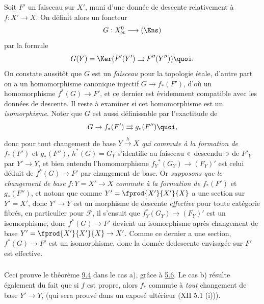 \documentclass[10pt]{../fichiers-configuration-latex/smfart}
\begin{document}
Soit $F'$ un faisceau sur $X'$, muni d'une donnée de descente
relativement à $f:X'\rightarrow X$. On définit alors un foncteur
$$
G:X^{0}_{\text{\rm ét}}\longrightarrow (\Ens)
$$
par la formule
$$
G(Y)=\Ker (F'(Y')\rightrightarrows F''(Y'')){\quoi}.
$$
On constate aussitôt que $G$ est un \emph{faisceau} pour la topologie
étale, d'autre part on a un homomorphisme canonique injectif
$G\rightarrow f_{\ast}(F')$, d'où un homomorphisme
$f^{\ast}(G)\rightarrow F'$, et ce dernier est évidemment compatible
avec les données de descente. Il reste à examiner si cet homomorphisme
est un \emph{isomorphisme}. Noter que $G$ est aussi définissable par
l'exactitude de
$$
G\rightarrow f_{\ast}(F')\rightrightarrows g_{\ast}(F''){\quoi},
$$
donc pour tout changement de base $Y\xrightarrow{h}X$ \emph{qui
  commute à la formation de} $f_{\ast}(F')$ et $g_{\ast}(F'')$,
$h^{\ast}(G)=G_{Y}$ s'identifie au faisceau « descendu » de
$F'_{Y'}$ par $Y'\rightarrow Y$, et bien entendu l'homomorphisme
$f_{Y}{}^{\ast}(G_{Y})\rightarrow (F_{Y})'$ est celui déduit de
$f^{\ast}(G)\rightarrow F'$ par changement de base. Or \emph{supposons
  que le changement de base} $f:Y=X'\rightarrow X$ \emph{commute à la
  formation de} $f_{\ast}(F')$ et $g_{\ast}(F'')$, et notons que comme
$Y'=\fprod{X'}{X'}{X}$ a une section sur $Y'=X'$, donc $Y'\rightarrow
Y$ est un morphisme de descente \emph{effective} pour toute catégorie
fibrés, en particulier pour $\mathcal{F}$, il s'ensuit que
$f^{\ast}_{Y}(G_{Y})\rightarrow (F_{Y})'$ est un isomorphisme, donc
$f^{\ast}(G)\rightarrow F'$ devient un isomorphisme après changement
de base $Y'=\fprod{X'}{X'}{X}\rightarrow X'$. Comme ce dernier a une
section, $f^{\ast}(G)\rightarrow F'$ est un isomorphisme, donc la
donnée de\pageoriginale  descente envisagée sur $F'$ est effective.

\subsubsection{}

Ceci prouve le théorème \hyperref[VIII.thm9.4]{9.4} dans le cas a), grâce à \hyperref[VIII.cor5.6]{5.6}. Le cas b)
résulte également du fait que si $f$ est propre, alors $f_{\ast}$
commute à \emph{tout} changement de base $Y'\rightarrow Y$, (qui sera
prouvé dans un exposé ultérieur (XII 5.1 (i))).

\subsubsection{}
\end{document}
